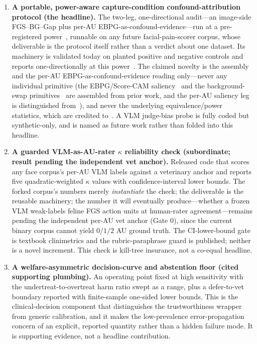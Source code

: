 \begin{enumerate}
  \item \textbf{A portable, power-aware capture-condition confound-attribution
    protocol (the headline).} The two-leg, one-directional audit---an image-side
    FGS--BG--Gap plus per-AU EBPG-as-confound-evidence---run at a pre-registered
    power~\autocite{huanghooker2026fairness,singh2023samplesize}, runnable on any
    future facial-pain-scorer corpus, whose deliverable is the protocol itself
    rather than a verdict about one dataset. Its machinery is validated today on
    planted positive and negative controls and reports one-directionally at this
    power~\autocite{adebayo2022posthoc}. The claimed novelty is the
    assembly and the per-AU EBPG-as-confound-evidence reading
    only---never any individual primitive (the EBPG/Score-CAM
    saliency~\autocite{wang2020scorecam} and the background-swap
    primitives~\autocite{xiao2021noise,moayeri2022comprehensive} are assembled
    from prior work, and the per-AU saliency leg is distinguished
    from~\autocite{lencioni2025segment}), and never the underlying
    equivalence/power statistics, which are credited
    to~\autocite{huanghooker2026fairness,singh2023samplesize}. A VLM judge-bias
    probe is fully coded but synthetic-only, and is named as future work rather
    than folded into this headline.
  \item \textbf{A guarded VLM-as-AU-rater $\kappa$ reliability check (subordinate;
    result pending the independent vet anchor).} Released code that
    scores any face corpus's per-AU VLM labels against a veterinary anchor and
    reports five quadratic-weighted $\kappa$ values with confidence-interval lower
    bounds. The forked corpus's numbers merely \emph{instantiate} the check;
    the deliverable is the reusable machinery; the number it will
    eventually produce---whether a frozen VLM weak-labels feline FGS action
    units at human-rater agreement---remains pending the independent per-AU
    vet anchor (Gate 0), since the current binary corpus cannot yield $0/1/2$
    AU ground truth. The CI-lower-bound gate is textbook clinimetrics and the
    rubric-paraphrase guard is published; neither is a novel increment. This check
    is kill-tree insurance, not a co-equal headline.
  \item \textbf{A welfare-asymmetric decision-curve and abstention floor (cited
    supporting plumbing).} An
    operating point fixed at high sensitivity with the undertreat-to-overtreat
    harm ratio swept as a range, plus a defer-to-vet boundary reported with
    finite-sample one-sided lower bounds. This is the clinical-decision
    component that distinguishes the trustworthiness wrapper from generic
    calibration, and it makes the low-prevalence error-propagation concern of
    \textcite{chavoshi2025} an explicit, reported quantity rather than a hidden
    failure mode. It is supporting evidence, not a headline contribution.
\end{enumerate}

